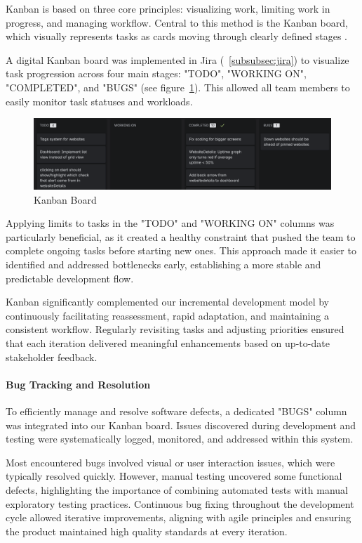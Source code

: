 Kanban is based on three core principles: visualizing work, limiting work in progress, and managing workflow. Central to this method is the Kanban board, which visually represents tasks as cards moving through clearly defined stages \autocite[p. 49–51]{hammarberg-2014}.

A digital Kanban board was implemented in Jira (~\ref{subsubsec:jira}) to visualize task progression across four main stages: "TODO", "WORKING ON", "COMPLETED", and "BUGS" (see figure~\ref{fig:kanban_board}). This allowed all team members to easily monitor task statuses and workloads.
\begin{figure}[H] 
\centering 
\includegraphics[width=1\linewidth]{figures/kanbanboard.png} 
\caption{Kanban Board} 
\label{fig:kanban_board} 
\end{figure}

Applying limits to tasks in the "TODO" and "WORKING ON" columns was particularly beneficial, as it created a healthy constraint that pushed the team to complete ongoing tasks before starting new ones. This approach made it easier to identified and addressed bottlenecks early, establishing a more stable and predictable development flow.

Kanban significantly complemented our incremental development model by continuously facilitating reassessment, rapid adaptation, and maintaining a consistent workflow. Regularly revisiting tasks and adjusting priorities ensured that each iteration delivered meaningful enhancements based on up-to-date stakeholder feedback.


\paragraph{Bug Tracking and Resolution}
To efficiently manage and resolve software defects, a dedicated "BUGS" column was integrated into our Kanban board. Issues discovered during development and testing were systematically logged, monitored, and addressed within this system.

Most encountered bugs involved visual or user interaction issues, which were typically resolved quickly. However, manual testing uncovered some functional defects, highlighting the importance of combining automated tests with manual exploratory testing practices. Continuous bug fixing throughout the development cycle allowed iterative improvements, aligning with agile principles and ensuring the product maintained high quality standards at every iteration.

